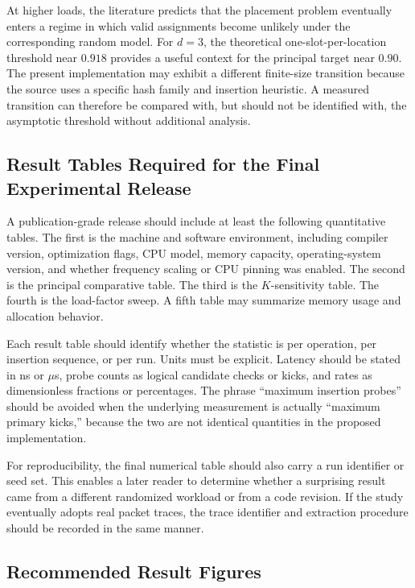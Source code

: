 \documentclass[conference]{IEEEtran}
\begin{document}
At higher loads, the literature predicts that the placement problem eventually enters a regime in which valid assignments become unlikely under the corresponding random model. For $d=3$, the theoretical one-slot-per-location threshold near $0.918$ provides a useful context for the principal target near $0.90$. The present implementation may exhibit a different finite-size transition because the source uses a specific hash family and insertion heuristic. A measured transition can therefore be compared with, but should not be identified with, the asymptotic threshold without additional analysis.

\subsection{Result Tables Required for the Final Experimental Release}
\label{subsec:final_result_tables}

A publication-grade release should include at least the following quantitative tables. The first is the machine and software environment, including compiler version, optimization flags, CPU model, memory capacity, operating-system version, and whether frequency scaling or CPU pinning was enabled. The second is the principal comparative table. The third is the $K$-sensitivity table. The fourth is the load-factor sweep. A fifth table may summarize memory usage and allocation behavior.

Each result table should identify whether the statistic is per operation, per insertion sequence, or per run. Units must be explicit. Latency should be stated in ns or $\mu$s, probe counts as logical candidate checks or kicks, and rates as dimensionless fractions or percentages. The phrase ``maximum insertion probes'' should be avoided when the underlying measurement is actually ``maximum primary kicks,'' because the two are not identical quantities in the proposed implementation.

For reproducibility, the final numerical table should also carry a run identifier or seed set. This enables a later reader to determine whether a surprising result came from a different randomized workload or from a code revision. If the study eventually adopts real packet traces, the trace identifier and extraction procedure should be recorded in the same manner.

\subsection{Recommended Result Figures}
\label{subsec:result_figures}
\end{document}
